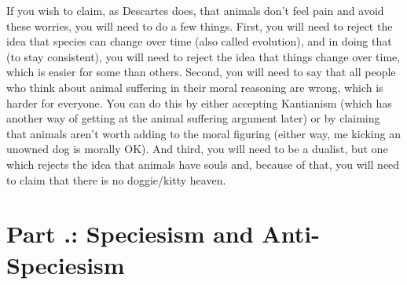 If you wish to claim, as Descartes does, that animals don't feel pain and avoid these worries, you will need to do a few things. First, you will need to reject the idea that species can change over time (also called evolution), and in doing that (to stay consistent), you will need to reject the idea that things change over time, which is easier for some than others. Second, you will need to say that all people who think about animal suffering in their moral reasoning are wrong, which is harder for everyone. You can do this by either accepting Kantianism (which has another way of getting at the animal suffering argument later) or by claiming that animals aren't worth adding to the moral figuring (either way, me kicking an unowned dog is morally OK). And third, you will need to be a dualist, but one which rejects the idea that animals have souls and, because of that, you will need to claim that there is no doggie/kitty heaven.

\section{Part \thechapcount.\theseccount: Speciesism and Anti-Speciesism}

